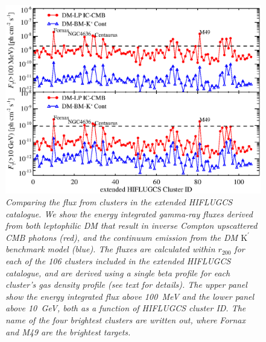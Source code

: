 \documentclass[10pt,aps,pra,reprint,amsmath,amsfonts,amssymb,showpacs]{revtex4-1}
\newcommand{\rmn}{\mathrm}
\newcommand{\Kp}{\rmn{K}^\prime}
\newcommand{\rvir}{r_{200}}
\begin{document}
\begin{figure}%
\begin{minipage}{2.0\columnwidth}
 \includegraphics[width=0.99\columnwidth]{figures/Flux.comp.DM.eps}
\caption{\it Comparing the flux from clusters in the extended HIFLUGCS
  catalogue. We show the energy integrated gamma-ray fluxes derived
  from both leptophilic DM that result in inverse Compton upscattered
  CMB photons (red), and the continuum emission from the DM $\Kp$
  benchmark model (blue). The fluxes are calculated within $\rvir$
  for each of the 106 clusters included in the extended HIFLUGCS
  catalogue, and are derived using a single beta profile for each
  cluster's gas density profile (see text for details). The upper
  panel show the energy integrated flux above 100~MeV and the lower
  panel above 10~GeV, both as a function of HIFLUGCS cluster ID. The
  name of the four brightest clusters are written out, where Fornax
  and M49 are the brightest targets.}
 \label{fig21}
\end{minipage}
\end{figure}
\end{document}
